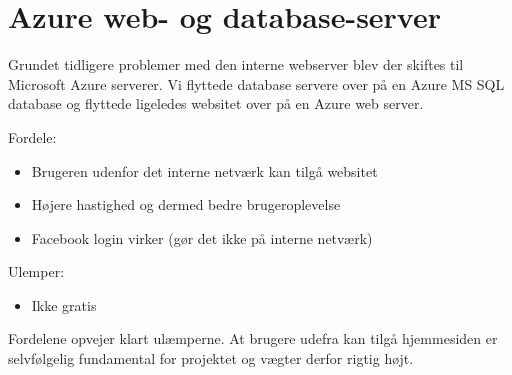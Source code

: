 \section{Azure web- og database-server}

Grundet tidligere problemer med den interne webserver blev der skiftes til Microsoft Azure serverer. Vi flyttede database servere over på en Azure MS SQL database og flyttede ligeledes websitet over på en Azure web server.

Fordele:
\begin{itemize}
	\item Brugeren udenfor det interne netværk kan tilgå websitet
	\item Højere hastighed og dermed bedre brugeroplevelse
	\item Facebook login virker (gør det ikke på interne netværk)
\end{itemize}

Ulemper:
\begin{itemize}
	\item Ikke gratis
\end{itemize}

Fordelene opvejer klart ulæmperne. At brugere udefra kan tilgå hjemmesiden er selvfølgelig fundamental for projektet og vægter derfor rigtig højt.